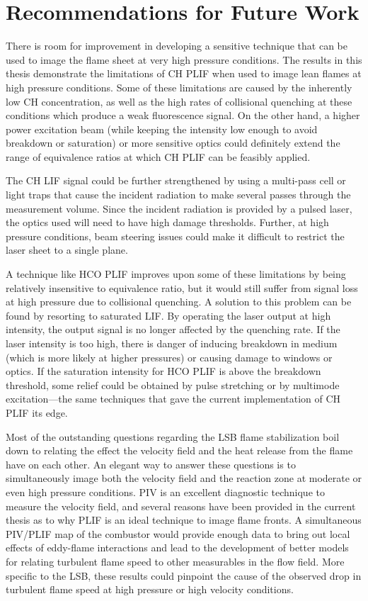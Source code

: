 \section{Recommendations for Future Work}

There is room for improvement in developing a sensitive technique that can be used to image the flame sheet at very high pressure conditions.
The results in this thesis demonstrate the limitations of CH PLIF when used to image lean flames at high pressure conditions.
Some of these limitations are caused by the inherently low CH concentration, as well as the high rates of collisional quenching at these conditions which produce a weak fluorescence signal.
On the other hand, a higher power excitation beam (while keeping the intensity low enough to avoid breakdown or saturation) or more sensitive optics could definitely extend the range of equivalence ratios at which CH PLIF can be feasibly applied.

The CH LIF signal could be further strengthened by using a multi-pass cell or light traps that cause the incident radiation to make several passes through the measurement volume.
Since the incident radiation is provided by a pulsed laser, the optics used will need to have high damage thresholds.
Further, at high pressure conditions, beam steering issues could make it difficult to restrict the laser sheet to a single plane.

A technique like HCO PLIF improves upon some of these limitations by being relatively insensitive to equivalence ratio, but it would still suffer from signal loss at high pressure due to collisional quenching.
A solution to this problem can be found by resorting to saturated LIF.
By operating the laser output at high intensity, the output signal is no longer affected by the quenching rate.
If the laser intensity is too high, there is danger of inducing breakdown in medium (which is more likely at higher pressures) or causing damage to windows or optics.
If the saturation intensity for HCO PLIF is above the breakdown threshold, some relief could be obtained by pulse stretching or by multimode excitation---the same techniques that gave the current implementation of CH PLIF its edge.

Most of the outstanding questions regarding the LSB flame stabilization boil down to relating the effect the velocity field and the heat release from the flame have on each other.
An elegant way to answer these questions is to simultaneously image both the velocity field and the reaction zone at moderate or even high pressure conditions.
PIV is an excellent diagnostic technique to measure the velocity field, and several reasons have been provided in the current thesis as to why PLIF is an ideal technique to image flame fronts.
A simultaneous PIV/PLIF map of the combustor would provide enough data to bring out local effects of eddy-flame interactions and lead to the development of better models for relating turbulent flame speed to other measurables in the flow field.
More specific to the LSB, these results could pinpoint the cause of the observed drop in turbulent flame speed at high pressure or high velocity conditions.

